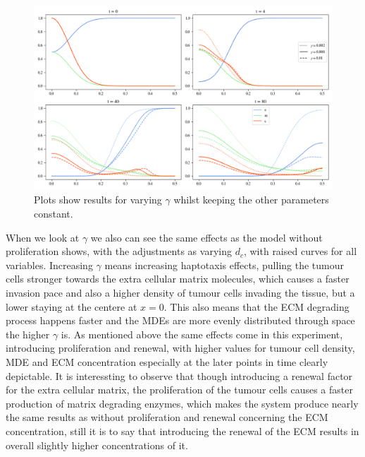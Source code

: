 \begin{figure}[h]
    \centering
    \includegraphics[width=\textwidth]{resources/images/prolif_gamma_variation.png}
    \caption{Plots show results for varying $\gamma$ whilst keeping the other parameters constant.}
    \label{fig:prolif_gamma_variation}
\end{figure}

When we look at $\gamma$ we also can see the same effects as the model without proliferation shows, with the adjustments as varying $d_c$, with raised curves for all variables. Increasing $\gamma$ means increasing haptotaxis effects, pulling the tumour cells stronger towards the extra cellular matrix molecules, which causes a faster invasion pace and also a higher density of tumour cells invading the tissue, but a lower staying at the centere at $x=0$. This also means that the ECM degrading process happens faster and the MDEs are more evenly distributed through space the higher $\gamma$ is. As mentioned above the same effects come in this experiment, introducing proliferation and renewal, with higher values for tumour cell density, MDE and ECM concentration especially at the later points in time clearly depictable. It is interessting to observe that though introducing a renewal factor for the extra cellular matrix, the proliferation of the tumour cells causes a faster production of matrix degrading enzymes, which makes the system produce nearly the same results as without proliferation and renewal concerning the ECM concentration, still  it is to say that introducing the renewal of the ECM results in overall slightly higher concentrations of it.

